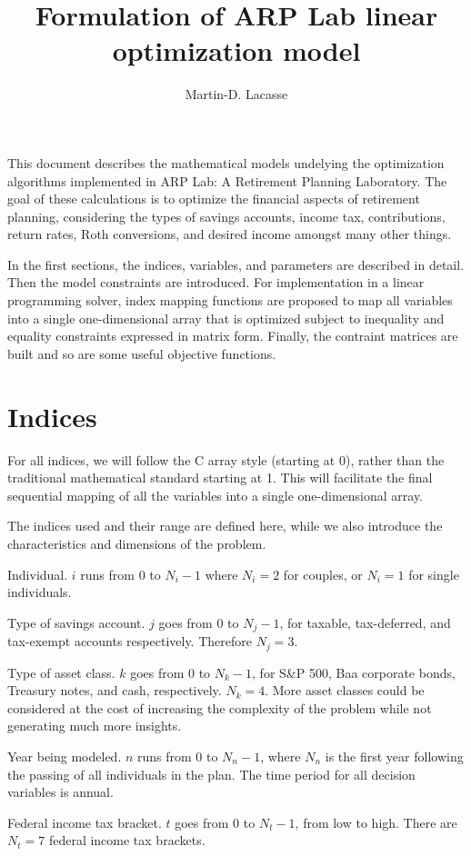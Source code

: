 \documentclass{article}[fleqn,12pt]
\begin{document}
\title{Formulation of ARP Lab linear optimization model}
\author{Martin-D. Lacasse}
\maketitle
\thispagestyle{fancy}
\fancyhead{}

This document describes the mathematical models undelying
the optimization algorithms implemented in
ARP Lab: A Retirement Planning Laboratory. The goal of
these calculations is to optimize the financial aspects
of retirement planning, considering the types of savings accounts,
income tax, contributions, return rates, Roth conversions,
and desired income amongst many other things.

In the first sections, the indices, variables, and parameters are
described in detail. Then the model constraints are introduced.
For implementation in a linear programming solver, index mapping
functions are proposed to map all variables into a single
one-dimensional array that
is optimized subject to inequality and equality constraints
expressed in matrix form. Finally, the contraint matrices are built
and so are some useful objective functions.

\section{Indices}
For all indices, we will follow the C array style (starting at 0),
rather than the traditional mathematical standard starting at 1.
This will facilitate the final
sequential mapping of all the variables into a single one-dimensional array.

The indices used and their range are defined here, while we also
introduce the characteristics and dimensions of the problem.
\begin{description}[leftmargin=4em,style=multiline]
\item [$i$]
	Individual. $i$ runs from 0 to $N_i - 1$ where $N_i = 2$ for couples,
	or $N_i= 1$ for single individuals. 
\item [$j$]
	Type of savings account. $j$ goes from 0 to $N_j - 1$, for taxable, tax-deferred,
	and tax-exempt accounts respectively. Therefore $N_j = 3$.
\item[$k$]
	Type of asset class. $k$ goes from 0 to $N_k -1 $, for S\&P 500,
	Baa corporate bonds, Treasury notes, and cash, respectively. $N_k = 4$.
	More asset classes could be considered at the cost of increasing
	the complexity of the problem while not generating much more insights.
\item [$n$]
	Year being modeled. $n$ runs from 0 to $N_n - 1$, where $N_n$
	is the first year following the passing of all
	individuals in the plan. The time period for all decision variables is annual.
\item [$t$]
	Federal income tax bracket. $t$ goes from 0 to $N_t - 1$, from low to high.
	There are $N_t = 7$ federal income tax brackets.
\end{description}
\end{document}

